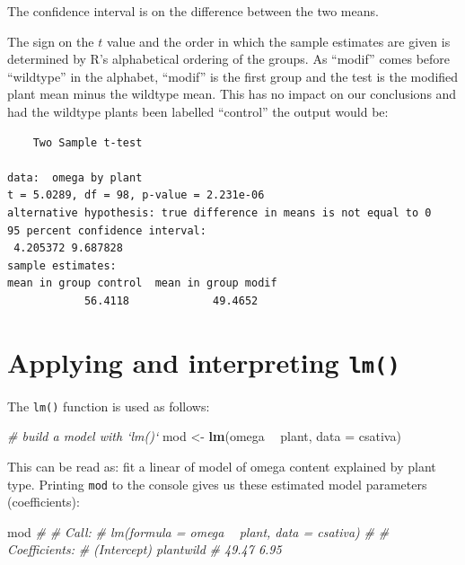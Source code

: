 \documentclass[
]{book}
\newenvironment{Shaded}{\begin{snugshade}}{\end{snugshade}}
\newcommand{\CommentTok}[1]{\textcolor[rgb]{0.56,0.35,0.01}{\textit{#1}}}
\newcommand{\DataTypeTok}[1]{\textcolor[rgb]{0.13,0.29,0.53}{#1}}
\newcommand{\KeywordTok}[1]{\textcolor[rgb]{0.13,0.29,0.53}{\textbf{#1}}}
\newcommand{\NormalTok}[1]{#1}
\newcommand{\OperatorTok}[1]{\textcolor[rgb]{0.81,0.36,0.00}{\textbf{#1}}}
\newcommand{\StringTok}[1]{\textcolor[rgb]{0.31,0.60,0.02}{#1}}
\begin{document}
The confidence interval is on the difference between the two means.

The sign on the \(t\) value and the order in which the sample estimates are given is determined by R's alphabetical ordering of the groups. As ``modif'' comes before ``wildtype'' in the alphabet, ``modif'' is the first group and the test is the modified plant mean minus the wildtype mean. This has no impact on our conclusions and had the wildtype plants been labelled ``control'' the output would be:

\begin{verbatim}
    Two Sample t-test

data:  omega by plant
t = 5.0289, df = 98, p-value = 2.231e-06
alternative hypothesis: true difference in means is not equal to 0
95 percent confidence interval:
 4.205372 9.687828
sample estimates:
mean in group control  mean in group modif
            56.4118             49.4652
\end{verbatim}

\hypertarget{applying-and-interpreting-lm-1}{%
\section{\texorpdfstring{Applying and interpreting \texttt{lm()}}{Applying and interpreting lm()}}\label{applying-and-interpreting-lm-1}}

The \texttt{lm()} function is used as follows:

\begin{Shaded}
\begin{Highlighting}[]
\CommentTok{# build a model with `lm()`}
\NormalTok{mod <-}\StringTok{ }\KeywordTok{lm}\NormalTok{(omega }\OperatorTok{~}\StringTok{ }\NormalTok{plant, }\DataTypeTok{data =}\NormalTok{ csativa)}
\end{Highlighting}
\end{Shaded}

This can be read as: fit a linear of model of omega content explained by plant type. Printing \texttt{mod} to the console gives us these estimated model parameters (coefficients):

\begin{Shaded}
\begin{Highlighting}[]
\NormalTok{mod}
\CommentTok{# }
\CommentTok{# Call:}
\CommentTok{# lm(formula = omega ~ plant, data = csativa)}
\CommentTok{# }
\CommentTok{# Coefficients:}
\CommentTok{# (Intercept)    plantwild  }
\CommentTok{#       49.47         6.95}
\end{Highlighting}
\end{Shaded}
\end{document}

